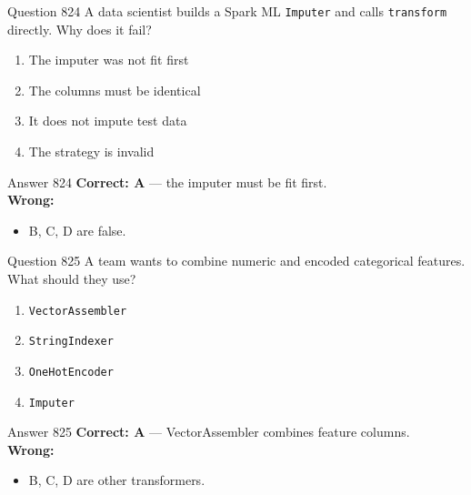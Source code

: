 \documentclass[aspectratio=169,11pt]{beamer}
\begin{document}
	\begin{frame}{Question 824}
		A data scientist builds a Spark ML \texttt{Imputer} and calls \texttt{transform} directly. Why does it fail?
		\begin{enumerate}[label=\Alph*.]
			\item The imputer was not fit first
			\item The columns must be identical
			\item It does not impute test data
			\item The strategy is invalid
		\end{enumerate}
	\end{frame}
	\begin{frame}{Answer 824}
		\textbf{Correct: A} --- the imputer must be fit first.\\
		\vspace{0.5em}
		\textbf{Wrong:}
		\begin{itemize}
			\item B, C, D are false.
		\end{itemize}
	\end{frame}
	
	\begin{frame}{Question 825}
		A team wants to combine numeric and encoded categorical features. What should they use?
		\begin{enumerate}[label=\Alph*.]
			\item \texttt{VectorAssembler}
			\item \texttt{StringIndexer}
			\item \texttt{OneHotEncoder}
			\item \texttt{Imputer}
		\end{enumerate}
	\end{frame}
	\begin{frame}{Answer 825}
		\textbf{Correct: A} --- VectorAssembler combines feature columns.\\
		\vspace{0.5em}
		\textbf{Wrong:}
		\begin{itemize}
			\item B, C, D are other transformers.
		\end{itemize}
	\end{frame}
	
\end{document}
